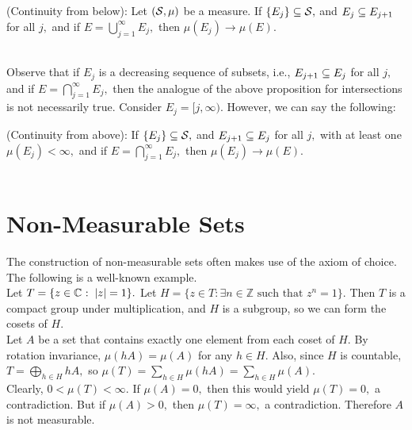 \begin{prop}
(Continuity from below): Let $(\mathcal{S},\mu)$ be a measure. If $\{E_j\}\subseteq\mathcal{S},$ and $E_j\subseteq E_{j+1}$ for all $j,$ and if $E=\bigcup_{j=1}^{\infty} E_j,$ then $\mu(E_j)\rightarrow\mu(E).$ \\ \\
\end{prop}

\noindent Observe that if $E_j$ is a decreasing sequence of subsets, i.e., $E_{j+1}\subseteq E_j$ for all $j,$ and if $E=\bigcap_{j=1}^{\infty} E_j,$ then the analogue of the above proposition for intersections is not necessarily true. Consider $E_j=[j,\infty).$ However, we can say the following:

\begin{prop}
(Continuity from above): If $\{E_j\}\subseteq\mathcal{S},$ and $E_{j+1}\subseteq E_j$ for all $j,$ with at least one $\mu(E_j)<\infty,$ and if $E=\bigcap_{j=1}^{\infty} E_j,$ then $\mu(E_j)\rightarrow \mu(E).$ \\ \\
\end{prop}

\section{Non-Measurable Sets}
The construction of non-measurable sets often makes use of the axiom of choice. The following is a well-known example. \\
\Ex Let $T=\{z\in\mathbb{C}^{}:\;|z|=1\}.$ Let $H=\{z\in T:\exists n\in\mathbb{Z}\text{ such that } z^n=1\}.$ Then $T$ is a compact group under multiplication, and $H$ is a subgroup, so we can form the cosets of $H.$ \\
Let $A$ be a set that contains exactly one element from each coset of $H.$ By rotation invariance, $\mu(hA)=\mu(A)$ for any $h\in H.$ Also, since $H$ is countable, $T=\bigoplus_{h\in H} hA,$ so $\mu(T)=\sum_{h\in H}\mu(hA)=\sum_{h\in H}\mu(A).$ \\
Clearly, $0<\mu(T)<\infty.$ If $\mu(A)=0,$ then this would yield $\mu(T)=0,$ a contradiction. But if $\mu(A)>0,$ then $\mu(T)=\infty,$ a contradiction. Therefore $A$ is not measurable.